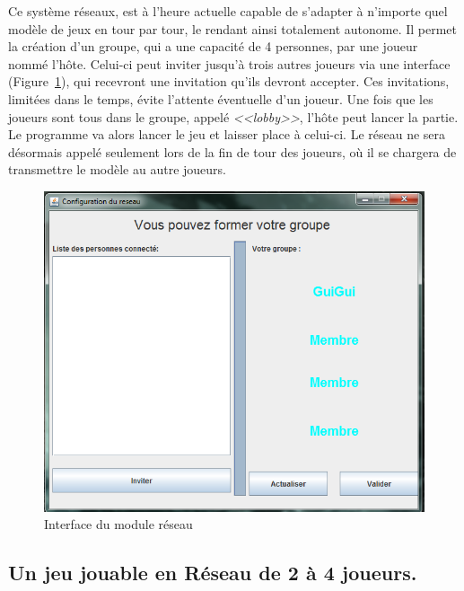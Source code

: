 \documentclass[a4paper, titlepage]{livret}
\begin{document}
	Ce système réseaux, est à l'heure actuelle capable de s'adapter à n'importe quel modèle de jeux en tour par tour, le rendant ainsi totalement autonome. Il permet la création d'un groupe, qui a une capacité de 4 personnes, par une joueur nommé l’hôte. Celui-ci peut inviter jusqu'à trois autres joueurs via une interface (Figure~\ref{interface reseau}), qui recevront une invitation qu'ils devront accepter. Ces invitations, limitées dans le temps, évite l'attente éventuelle d'un joueur. Une fois que les joueurs sont tous dans le groupe, appelé \textit{<<lobby>>}, l'hôte peut lancer la partie. Le programme va alors lancer le jeu et laisser place à celui-ci. Le réseau ne sera désormais appelé seulement lors de la fin de tour des joueurs, où il se chargera de transmettre le modèle au autre joueurs.
	
	 \begin{figure}[th]
	\begin{center}
	\includegraphics[scale=0.4]{Assets/connection3.png} 
	\caption{Interface du module réseau}
     \label{interface reseau}
      \end{center}
    \end{figure}

	\newpage
	
	\subsection{Un jeu jouable en Réseau de 2 à 4 joueurs.}
	
\end{document}

